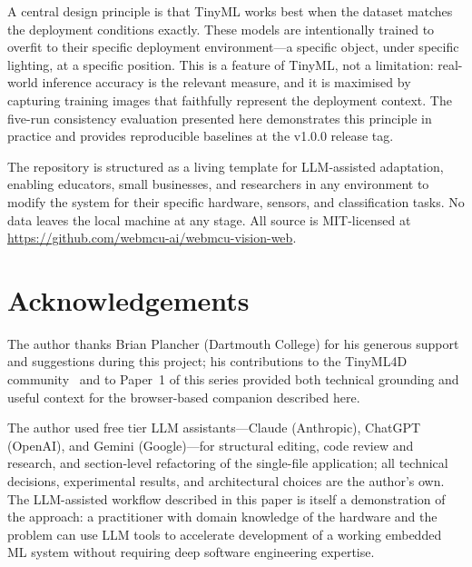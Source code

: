 \documentclass[11pt]{article}
\begin{document}
A central design principle is that TinyML works best when the dataset matches the
deployment conditions exactly. These models are intentionally trained to overfit to
their specific deployment environment---a specific object, under specific lighting,
at a specific position. This is a feature of TinyML, not a limitation: real-world
inference accuracy is the relevant measure, and it is maximised by capturing training
images that faithfully represent the deployment context. The five-run consistency
evaluation presented here demonstrates this principle in practice and provides
reproducible baselines at the v1.0.0 release tag.

The repository is structured as a living template for LLM-assisted adaptation,
enabling educators, small businesses, and researchers in any environment to modify the
system for their specific hardware, sensors, and classification tasks. No data leaves
the local machine at any stage. All source is MIT-licensed at
\url{https://github.com/webmcu-ai/webmcu-vision-web}.

\section*{Acknowledgements}

The author thanks Brian Plancher (Dartmouth College) for his generous support and
suggestions during this project; his contributions to the TinyML4D community~\cite{plancher2024tinymld}
and to Paper~1 of this series provided both technical grounding and useful context for the
browser-based companion described here.

The author used free tier LLM assistants---Claude (Anthropic), ChatGPT (OpenAI), and Gemini
(Google)---for structural editing, code review and research, and section-level refactoring of the
single-file application; all technical decisions, experimental results, and
architectural choices are the author's own. The LLM-assisted workflow described in
this paper is itself a demonstration of the approach: a practitioner with domain
knowledge of the hardware and the problem can use LLM tools to accelerate development
of a working embedded ML system without requiring deep software engineering expertise.
\end{document}
